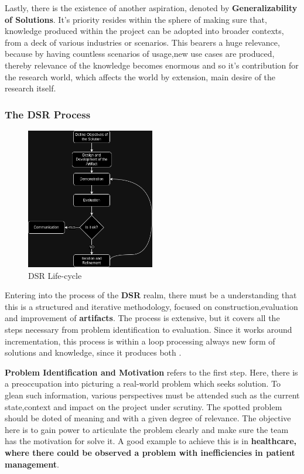 Lastly, there is the existence of another aspiration, denoted by \textbf{Generalizability of Solutions}. It's priority resides within the sphere of making sure that, knowledge produced within the project can be adopted into broader contexts, from a deck of various industries or scenarios. This bearers a huge relevance, because by having countless scenarios of usage,new use cases are produced, thereby relevance of the knowledge becomes enormous and so it's contribution for the research world, which affects the world by extension, main desire of the research itself.

\subsubsection{The DSR Process}
\begin{figure}[H]
    \centering
    \includegraphics[width=0.5\textwidth]{assets/tools/dsr/DSR.drawio.png} %
    \caption{DSR Life-cycle}
    \label{fig:sample-image} 
\end{figure}
Entering into the process of the \textbf{DSR} realm, there must be a understanding that this is a structured and iterative methodology, focused on construction,evaluation and improvement of \textbf{artifacts}. The process is extensive, but it covers all the steps necessary from problem identification to evaluation. Since it works around incrementation, this process is within a loop processing always new form of solutions and knowledge, since it produces both \cite{dsr-book}.

\textbf{Problem Identification and Motivation} refers to the first step. Here, there is a preoccupation into picturing a real-world problem which seeks solution. To glean such information, various perspectives must be attended such as the current state,context and impact on the project under scrutiny. The spotted problem should be doted of meaning and with a given degree of relevance. The objective here is to gain power to articulate the problem clearly and make sure the team has the motivation for solve it. A good example to achieve this is in \textbf{healthcare, where there could be observed a problem with inefficiencies in patient management}.

